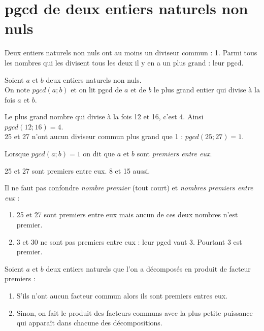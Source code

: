 \documentclass[a4paper,12pt,french]{book}
\begin{document}
\section{pgcd de deux entiers naturels non nuls}

Deux entiers naturels non nuls ont au moins un diviseur commun : 1. Parmi tous les nombres qui les divisent tous les deux il y en a un plus grand : leur pgcd.

\begin{definition}[]
	Soient $a$ et $b$ deux entiers naturels non nuls.\\
	On note $pgcd(a;b)$ et on lit \og pgcd de $a$ et de $b$\fg{} le plus grand entier qui divise à la fois $a$ et $b$.
\end{definition}

\begin{exemple}[s]
	Le plus grand nombre qui divise à la fois 12 et 16, c'est 4. Ainsi $pgcd(12;16)=4$.\\
	25 et 27 n'ont aucun diviseur commun plus grand que 1 : $pgcd(25;27)=1$.\\
\end{exemple}

\begin{definition}[]
	Lorsque $pgcd(a;b)=1$ on dit que $a$ et $b$ sont \textit{premiers entre eux}.
\end{definition}

\begin{exemple}[s]
	25 et 27 sont premiers entre eux. 8 et 15 aussi.
\end{exemple}

\begin{remarque}[]
	Il ne faut pas confondre \textit{nombre premier} (tout court) et \textit{nombres premiers entre eux} :
	\begin{enumerate}[\textbullet]
		\item 	25 et 27 sont premiers entre eux mais aucun de ces deux nombres n'est premier.
		\item 	3 et 30 ne sont pas premiers entre eux : leur pgcd vaut 3. Pourtant 3 est premier.
	\end{enumerate}
\end{remarque}

\begin{methode}[]
	Soient $a$ et $b$ deux entiers naturels que l'on a décomposés en produit de facteur premiers :
	\begin{enumerate}[\textbullet]
		\item 	S'ils n'ont aucun facteur commun alors ils sont premiers entres eux.
		\item 	Sinon, on fait le produit des facteurs communs avec la plus petite puissance qui apparaît dans chacune des décompositions.
	\end{enumerate}
\end{methode}
\end{document}
